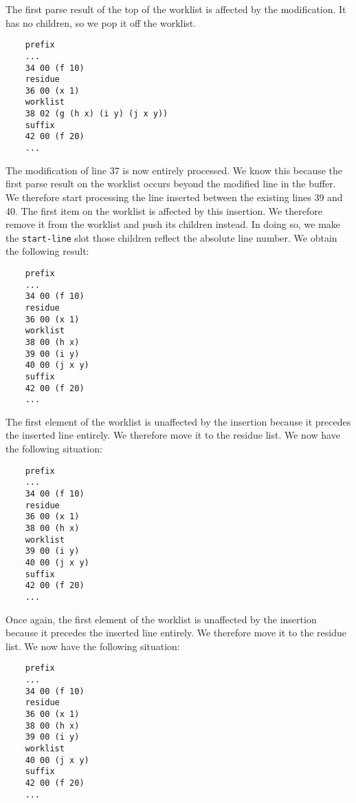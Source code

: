 The first parse result of the top of the worklist is affected by the
modification.  It has no children, so we pop it off the worklist.

\vspace{-5mm}
{\small\begin{verbatim}
    prefix
    ...
    34 00 (f 10)
    residue
    36 00 (x 1)
    worklist
    38 02 (g (h x) (i y) (j x y))
    suffix
    42 00 (f 20)
    ...
\end{verbatim}}
\vspace{-5mm}

The modification of line 37 is now entirely processed.  We know this
because the first parse result on the worklist occurs beyond the
modified line in the buffer.  We therefore start processing the line
inserted between the existing lines 39 and 40.  The first item on the
worklist is affected by this insertion.  We therefore remove it from
the worklist and push its children instead.  In doing so, we make the
\texttt{start-line} slot those children reflect the absolute line
number.  We obtain the following result:

\vspace{-5mm}
{\small\begin{verbatim}
    prefix
    ...
    34 00 (f 10)
    residue
    36 00 (x 1)
    worklist
    38 00 (h x)
    39 00 (i y)
    40 00 (j x y)
    suffix
    42 00 (f 20)
    ...
\end{verbatim}}
\vspace{-5mm}

The first element of the worklist is unaffected by the insertion
because it precedes the inserted line entirely.  We therefore move it
to the residue list.  We now have the following situation:

\vspace{-5mm}
{\small\begin{verbatim}
    prefix
    ...
    34 00 (f 10)
    residue
    36 00 (x 1)
    38 00 (h x)
    worklist
    39 00 (i y)
    40 00 (j x y)
    suffix
    42 00 (f 20)
    ...
\end{verbatim}}
\vspace{-5mm}

Once again, the first element of the worklist is unaffected by the
insertion because it precedes the inserted line entirely.  We
therefore move it to the residue list.  We now have the following
situation:

\vspace{-5mm}
{\small\begin{verbatim}
    prefix
    ...
    34 00 (f 10)
    residue
    36 00 (x 1)
    38 00 (h x)
    39 00 (i y)
    worklist
    40 00 (j x y)
    suffix
    42 00 (f 20)
    ...
\end{verbatim}}
\vspace{-5mm}

